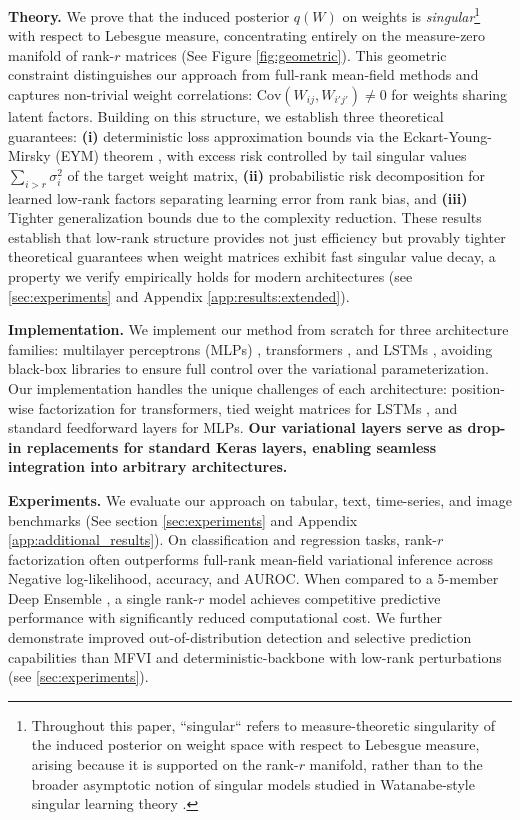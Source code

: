 \documentclass{article}
\theoremstyle{plain}
\theoremstyle{definition}
\theoremstyle{remark}
\begin{document}
\noindent\textbf{Theory.} We prove that the induced posterior $q(W)$ on weights is \emph{singular}\footnote{Throughout this paper, ``singular`` refers to measure-theoretic singularity of the induced posterior on weight space with respect to Lebesgue measure, arising because it is supported on the rank-$r$ manifold, rather than to the broader asymptotic notion of singular models studied in Watanabe-style singular learning theory \cite{watanabe2009algebraic,watanabe2010asymptotic,watanabe2013widely}.}
 with respect to Lebesgue measure, concentrating entirely on the measure-zero manifold of rank-$r$ matrices (See Figure \ref{fig:geometric}). This geometric constraint distinguishes our approach from full-rank mean-field methods and captures non-trivial weight correlations: $\text{Cov}(W_{ij}, W_{i'j'}) \neq 0$ for weights sharing latent factors. Building on this structure, we establish three 
theoretical guarantees: \textbf{(i)} deterministic loss approximation bounds via the 
Eckart-Young-Mirsky (EYM) theorem \cite{eckart1936approximation}, with excess risk controlled by tail singular values 
$\sum_{i>r} \sigma_i^2$ of the target weight matrix, \textbf{(ii)} probabilistic risk 
decomposition for learned low-rank factors separating learning error from rank bias, 
and \textbf{(iii)} Tighter generalization bounds due to the complexity reduction. These results establish 
that low-rank structure provides not just efficiency but provably tighter theoretical 
guarantees when weight matrices exhibit fast singular value decay, a property we verify 
empirically holds for modern architectures (see \cref{sec:experiments} and Appendix \ref{app:results:extended}). 

\noindent\textbf{Implementation.} We implement our method from scratch for three architecture families: multilayer perceptrons (MLPs) \cite{rumelhart1986learning}, transformers \cite{vaswani2017attention}, and LSTMs \cite{hochreiter1997long}, avoiding black-box libraries to ensure full control over the variational parameterization. Our implementation handles the unique challenges of each architecture: position-wise factorization for transformers, tied weight matrices for LSTMs \cite{fortunato2017bayesian}, and standard feedforward layers for MLPs. \textbf{Our variational layers serve as drop-in replacements for standard Keras layers, enabling seamless integration into arbitrary architectures.}

\noindent\textbf{Experiments.}
We evaluate our approach on tabular, text, time-series, and image benchmarks (See section \ref{sec:experiments} and Appendix \ref{app:additional_results}). On classification and regression tasks, rank-\(r\) factorization often outperforms full-rank mean-field variational inference \cite{blundell2015weight} across Negative log-likelihood, accuracy, and AUROC. 
When compared to a 5-member Deep Ensemble \cite{lakshminarayanan2017simple}, a single rank-\(r\) model achieves competitive predictive performance with significantly reduced computational cost. We further demonstrate improved out-of-distribution detection and selective prediction capabilities than MFVI and deterministic-backbone with low-rank perturbations\cite{dusenberry2020efficient} (see \cref{sec:experiments}).
\end{document}
